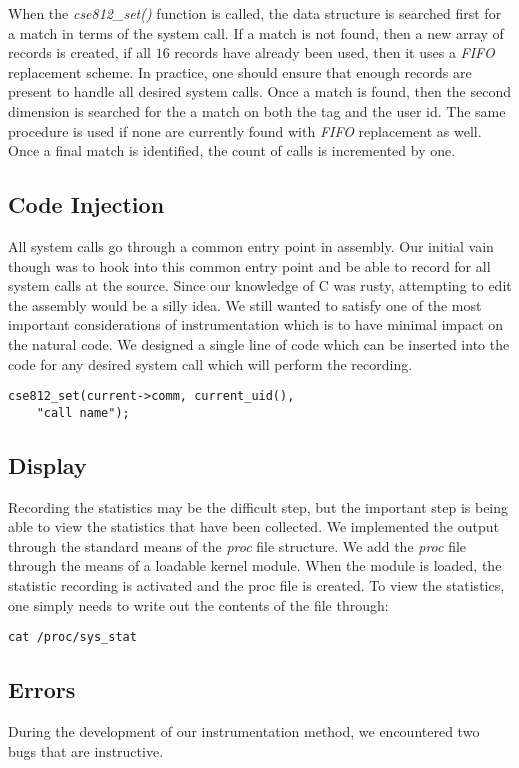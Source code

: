 \documentclass[conference]{IEEEtran}
\begin{document}
When the \textit{cse812\_set()} function is called, the data structure is searched first for a match in terms of the system call.
If a match is not found, then a new array of records is created, if all $16$ records have already been used, then it uses a \textit{FIFO} replacement scheme.
In practice, one should ensure that enough records are present to handle all desired system calls.
Once a match is found, then the second dimension is searched for the a match on both the tag and the user id.
The same procedure is used if none are currently found with \textit{FIFO} replacement as well.
Once a final match is identified, the count of calls is incremented by one.

\subsection{Code Injection}
All system calls go through a common entry point in assembly.
Our initial vain though was to hook into this common entry point and be able to record for all system calls at the source.
Since our knowledge of C was rusty, attempting to edit the assembly would be a silly idea.
We still wanted to satisfy one of the most important considerations of instrumentation which is to have minimal impact on the natural code.
We designed a single line of code which can be inserted into the code for any desired system call which will perform the recording.

\begin{verbatim}
cse812_set(current->comm, current_uid(),
    "call name");
\end{verbatim}

\subsection{Display}
Recording the statistics may be the difficult step, but the important step is being able to view the statistics that have been collected.
We implemented the output through the standard means of the \textit{proc} file structure.
We add the \textit{proc} file through the means of a loadable kernel module.
When the module is loaded, the statistic recording is activated and the proc file is created.
To view the statistics, one simply needs to write out the contents of the file through:

\begin{verbatim}
cat /proc/sys_stat
\end{verbatim}

\subsection{Errors}
During the development of our instrumentation method, we encountered two bugs that are instructive.
\end{document}
